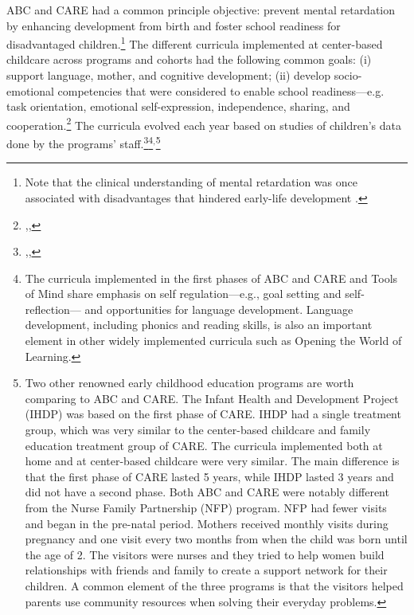 \noindent ABC and CARE had a common principle objective: prevent mental retardation by enhancing development from birth and foster school readiness for disadvantaged children.\footnote{Note that the clinical understanding of mental retardation was once associated with disadvantages that hindered early-life development \citep{Mental-Retardation_America_2004_BOOK_NYU}.} The different curricula implemented at center-based childcare across programs and cohorts had the following common goals: (i) support language, mother, and cognitive development; (ii) develop socio-emotional competencies that were considered to enable school readiness---e.g. task orientation, emotional self-expression, independence, sharing, and cooperation.\footnote{\citet{Sparling_1974_Synth_Edu_Infant_SPEECH},\citet{Ramey_Collier_etal_1976_CarolinaAbecedarianProject},\citet{Ramey-etal_2012-ABC}} The curricula evolved each year based on studies of children's data done by the programs' staff.\footnote{\citet{Ramey-etal_1975_AJoMD},\citet{Finkelstein_1982_Day_Care_YC},\citet{Haskins_1985_CD}}\footnote{The curricula implemented in the first phases of ABC and CARE and Tools of Mind share emphasis on self regulation---e.g., goal setting and self-reflection--- and opportunities for language development. Language development, including phonics and reading skills, is also an important element in other widely implemented curricula such as Opening the World of Learning.}${^{\text{,}}}$\footnote{Two other renowned early childhood education programs are worth comparing to ABC and CARE. The Infant Health and Development Project (IHDP) was based on the first phase of CARE. IHDP had a single treatment group, which was very similar to the center-based childcare and family education treatment group of CARE. The curricula implemented both at home and at center-based childcare were very similar. The main difference is that the first phase of CARE lasted 5 years, while IHDP lasted 3 years and did not have a second phase. Both ABC and CARE were notably different from the Nurse Family Partnership (NFP) program. NFP had fewer visits and began in the pre-natal period. Mothers received monthly visits during pregnancy and one visit every two months from when the child was born until the age of 2. The visitors were nurses and they tried to help women build relationships with friends and family to create a support network for their children. A common element of the three programs is that the visitors helped parents use community resources when solving their everyday problems.}\\

